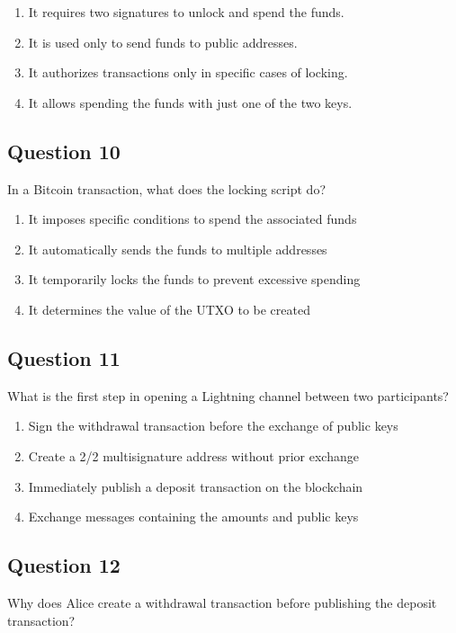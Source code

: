 \documentclass[12pt,a4paper]{article}
\begin{document}
\begin{enumerate}[label=\Alph*., leftmargin=*]
\item It requires two signatures to unlock and spend the funds.
\item It is used only to send funds to public addresses.
\item It authorizes transactions only in specific cases of locking.
\item It allows spending the funds with just one of the two keys.
\end{enumerate}

\bigskip


\subsection*{Question 10}
In a Bitcoin transaction, what does the locking script do?

\begin{enumerate}[label=\Alph*., leftmargin=*]
\item It imposes specific conditions to spend the associated funds
\item It automatically sends the funds to multiple addresses
\item It temporarily locks the funds to prevent excessive spending
\item It determines the value of the UTXO to be created
\end{enumerate}

\bigskip


\subsection*{Question 11}
What is the first step in opening a Lightning channel between two participants?

\begin{enumerate}[label=\Alph*., leftmargin=*]
\item Sign the withdrawal transaction before the exchange of public keys
\item Create a 2/2 multisignature address without prior exchange
\item Immediately publish a deposit transaction on the blockchain
\item Exchange messages containing the amounts and public keys
\end{enumerate}

\bigskip


\subsection*{Question 12}
Why does Alice create a withdrawal transaction before publishing the deposit transaction?
\end{document}
